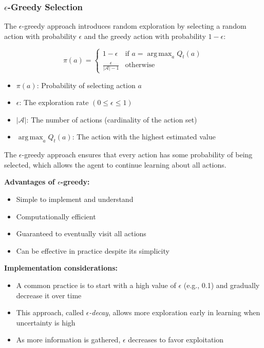 \documentclass{article}
\DeclareMathOperator*{\argmax}{arg\,max}
\begin{document}
\subsubsection{$\epsilon$-Greedy Selection}
The $\epsilon$-greedy approach introduces random exploration by selecting a random action with probability $\epsilon$ and the greedy action with probability $1-\epsilon$:

\begin{equation}
    \pi(a) = 
    \begin{cases}
        1-\epsilon & \text{if } a = \argmax_a Q_t(a) \\
        \frac{\epsilon}{|\mathcal{A}|-1} & \text{otherwise}
    \end{cases}
\end{equation}

\begin{tcolorbox}[colback=blue!5!white,colframe=blue!75!black,title=Notation Overview]
\begin{itemize}
    \item $\pi(a)$: Probability of selecting action $a$
    \item $\epsilon$: The exploration rate $(0 \leq \epsilon \leq 1)$
    \item $|\mathcal{A}|$: The number of actions (cardinality of the action set)
    \item $\argmax_a Q_t(a)$: The action with the highest estimated value
\end{itemize}
\end{tcolorbox}

The $\epsilon$-greedy approach ensures that every action has some probability of being selected, which allows the agent to continue learning about all actions.

\textbf{Advantages of $\epsilon$-greedy:}
\begin{itemize}
    \item Simple to implement and understand
    \item Computationally efficient
    \item Guaranteed to eventually visit all actions
    \item Can be effective in practice despite its simplicity
\end{itemize}

\textbf{Implementation considerations:}
\begin{itemize}
    \item A common practice is to start with a high value of $\epsilon$ (e.g., 0.1) and gradually decrease it over time
    \item This approach, called \textit{$\epsilon$-decay}, allows more exploration early in learning when uncertainty is high
    \item As more information is gathered, $\epsilon$ decreases to favor exploitation
\end{itemize}
\end{document}
